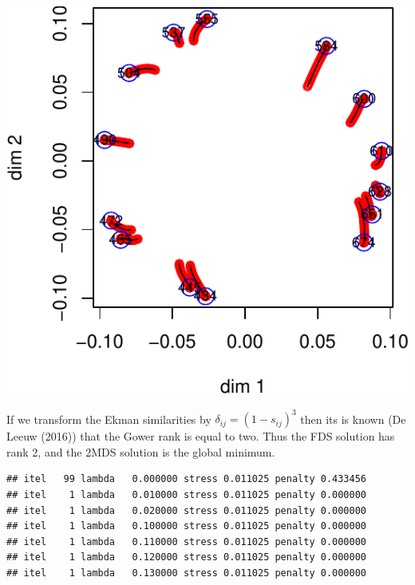 \documentclass[
  12pt,
]{article}
\begin{document}
\begin{center}\includegraphics{penalty_files/figure-latex/ekman-1} \end{center}

If we transform the Ekman similarities by \(\delta_{ij}=(1-s_{ij})^3\)
then its is known (De Leeuw (2016)) that the Gower rank is equal to two.
Thus the FDS solution has rank 2, and the 2MDS solution is the global
minimum.

\begin{verbatim}
## itel   99 lambda   0.000000 stress 0.011025 penalty 0.433456 
## itel    1 lambda   0.010000 stress 0.011025 penalty 0.000000 
## itel    1 lambda   0.020000 stress 0.011025 penalty 0.000000 
## itel    1 lambda   0.100000 stress 0.011025 penalty 0.000000 
## itel    1 lambda   0.110000 stress 0.011025 penalty 0.000000 
## itel    1 lambda   0.120000 stress 0.011025 penalty 0.000000 
## itel    1 lambda   0.130000 stress 0.011025 penalty 0.000000
\end{verbatim}
\end{document}
